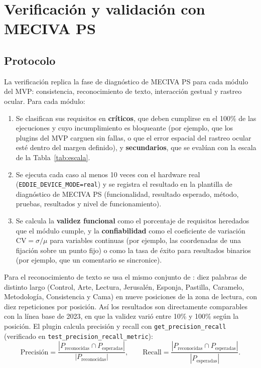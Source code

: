 \section{Verificación y validación con MECIVA PS}

\subsection{Protocolo}

La verificación replica la fase de diagnóstico de MECIVA PS \citep{ibaceta2023} para cada módulo del MVP: consistencia, reconocimiento de texto, interacción gestual y rastreo ocular. Para cada módulo:

\begin{enumerate}
  \item Se clasifican sus requisitos en \textbf{críticos}, que deben cumplirse en el 100\% de las ejecuciones y cuyo incumplimiento es bloqueante (por ejemplo, que los plugins del MVP carguen sin fallas, o que el error espacial del rastreo ocular esté dentro del margen definido), y \textbf{secundarios}, que se evalúan con la escala de la Tabla~\ref{tab:escala}.
  \item Se ejecuta cada caso al menos 10 veces con el hardware real (\texttt{EDDIE\_DEVICE\_MODE=real}) y se registra el resultado en la plantilla de diagnóstico de MECIVA PS (funcionalidad, resultado esperado, método, pruebas, resultados y nivel de funcionamiento).
  \item Se calcula la \textbf{validez funcional} como el porcentaje de requisitos heredados que el módulo cumple, y la \textbf{confiabilidad} como el coeficiente de variación $\mathrm{CV}=\sigma/\mu$ para variables continuas (por ejemplo, las coordenadas de una fijación sobre un punto fijo) o como la tasa de éxito para resultados binarios (por ejemplo, que un comentario se sincronice).
\end{enumerate}

Para el reconocimiento de texto se usa el mismo conjunto de \citet{ibaceta2023}: diez palabras de distinto largo (Control, Arte, Lectura, Jerusalén, Esponja, Pastilla, Caramelo, Metodología, Consistencia y Cama) en nueve posiciones de la zona de lectura, con diez repeticiones por posición. Así los resultados son directamente comparables con la línea base de 2023, en que la validez varió entre 10\% y 100\% según la posición. El plugin calcula precisión y recall con \texttt{get\_precision\_recall} (verificado en \texttt{test\_precision\_recall\_metric}):
\begin{equation}
\mathrm{Precisión}=\frac{|P_{\text{reconocidas}}\cap P_{\text{esperadas}}|}{|P_{\text{reconocidas}}|},\qquad
\mathrm{Recall}=\frac{|P_{\text{reconocidas}}\cap P_{\text{esperadas}}|}{|P_{\text{esperadas}}|}.
\end{equation}

